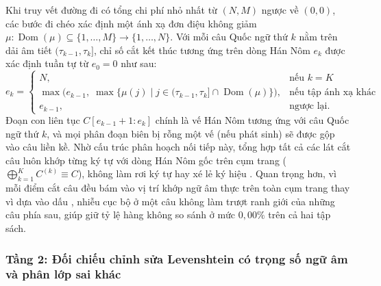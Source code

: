 Khi truy vết đường đi có tổng chi phí nhỏ nhất từ $(N, M)$ ngược về $(0, 0)$, các bước đi chéo xác định một ánh xạ đơn điệu không giảm $\mu: \operatorname{Dom}(\mu) \subseteq \{1,\dots,M\} \to \{1,\dots,N\}$. Với mỗi câu Quốc ngữ thứ $k$ nằm trên dải âm tiết $(\tau_{k-1}, \tau_k]$, chỉ số cắt kết thúc tương ứng trên dòng Hán Nôm $e_k$ được xác định tuần tự từ $e_0 = 0$ như sau:
\begin{equation}
    e_k =
    \begin{cases}
        N, & \text{nếu } k = K \\
        \max\Big(e_{k-1},\; \max\big\{\mu(j) \;\big|\; j \in (\tau_{k-1}, \tau_k] \cap \operatorname{Dom}(\mu)\big\}\Big), & \text{nếu tập ánh xạ khác rỗng} \\
        e_{k-1}, & \text{ngược lại.}
    \end{cases}
\end{equation}
Đoạn con liên tục $C[e_{k-1}+1 : e_k]$ chính là vế Hán Nôm tương ứng với câu Quốc ngữ thứ $k$, và mọi phân đoạn biên bị rỗng một vế (nếu phát sinh) sẽ được gộp vào câu liền kề. Nhờ cấu trúc phân hoạch nối tiếp này, tổng hợp tất cả các lát cắt câu luôn khớp từng ký tự với dòng Hán Nôm gốc trên cụm trang ($\bigoplus_{k=1}^K C^{(k)} \equiv C$), không làm rơi ký tự hay xé lẻ ký hiệu \code{[MASK]}. Quan trọng hơn, vì mỗi điểm cắt câu đều bám vào vị trí khớp ngữ âm thực trên toàn cụm trang thay vì dựa vào dấu , nhiễu cục bộ ở một câu không làm trượt ranh giới của những câu phía sau, giúp giữ tỷ lệ hàng không so sánh ở mức $0{,}00\%$ trên cả hai tập sách.

\subsubsection{Tầng 2: Đối chiếu chỉnh sửa Levenshtein có trọng số ngữ âm và phân lớp sai khác}

